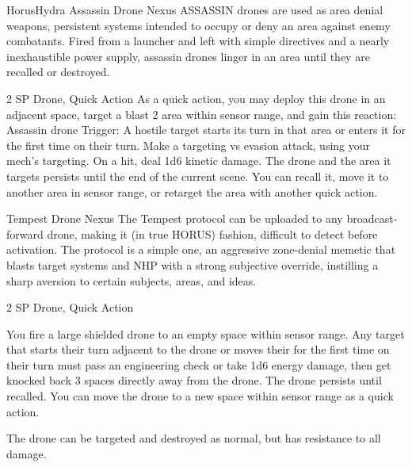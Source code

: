 \begin{mech}{Horus}{Hydra}
Assassin Drone Nexus
ASSASSIN drones are used as area denial weapons, persistent systems intended to occupy or deny an area against enemy combatants. Fired from a launcher and left with simple directives and a nearly inexhaustible power supply, assassin drones linger in an area until they are recalled or destroyed.

2 SP
Drone, Quick Action
As a quick action, you may deploy this drone in an adjacent space, target a blast 2 area within sensor range, and gain this reaction:
Assassin drone
Trigger: A hostile target starts its turn in that area or enters it for the first time on their turn. Make a targeting vs evasion attack, using your mech’s targeting. On a hit, deal 1d6 kinetic damage.
The drone and the area it targets persists until the end of the current scene. You can recall it, move it to another area in sensor range, or retarget the area with another quick action.

Tempest Drone Nexus
The Tempest protocol can be uploaded to any broadcast-forward drone, making it (in true HORUS) fashion, difficult to detect before activation. The protocol is a simple one, an aggressive zone-denial memetic that blasts target systems and NHP with a strong subjective override, instilling a sharp aversion to certain subjects, areas, and ideas.

2 SP
Drone, Quick Action

You fire a large shielded drone to an empty space within sensor range. Any target that starts their turn adjacent to the drone or moves their for the first time on their turn must pass an engineering check or take 1d6 energy damage, then get knocked back 3 spaces directly away from the drone. The drone persists until recalled. You can move the drone to a new space within sensor range as a quick action.

The drone can be targeted and destroyed as normal, but has resistance to all damage.


\end{mech}
